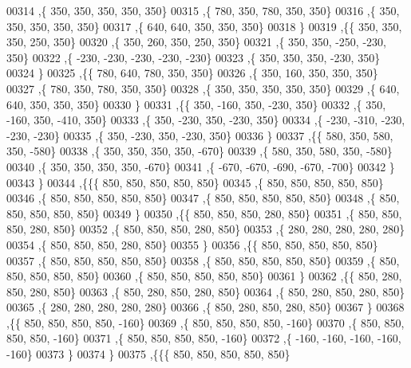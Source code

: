 \begin{DoxyCode}
00314    ,\{   350,   350,   350,   350,   350\}
00315    ,\{   780,   350,   780,   350,   350\}
00316    ,\{   350,   350,   350,   350,   350\}
00317    ,\{   640,   640,   350,   350,   350\}
00318    \}
00319   ,\{\{   350,   350,   350,   250,   350\}
00320    ,\{   350,   260,   350,   250,   350\}
00321    ,\{   350,   350,  -250,  -230,   350\}
00322    ,\{  -230,  -230,  -230,  -230,  -230\}
00323    ,\{   350,   350,   350,  -230,   350\}
00324    \}
00325   ,\{\{   780,   640,   780,   350,   350\}
00326    ,\{   350,   160,   350,   350,   350\}
00327    ,\{   780,   350,   780,   350,   350\}
00328    ,\{   350,   350,   350,   350,   350\}
00329    ,\{   640,   640,   350,   350,   350\}
00330    \}
00331   ,\{\{   350,  -160,   350,  -230,   350\}
00332    ,\{   350,  -160,   350,  -410,   350\}
00333    ,\{   350,  -230,   350,  -230,   350\}
00334    ,\{  -230,  -310,  -230,  -230,  -230\}
00335    ,\{   350,  -230,   350,  -230,   350\}
00336    \}
00337   ,\{\{   580,   350,   580,   350,  -580\}
00338    ,\{   350,   350,   350,   350,  -670\}
00339    ,\{   580,   350,   580,   350,  -580\}
00340    ,\{   350,   350,   350,   350,  -670\}
00341    ,\{  -670,  -670,  -690,  -670,  -700\}
00342    \}
00343   \}
00344  ,\{\{\{   850,   850,   850,   850,   850\}
00345    ,\{   850,   850,   850,   850,   850\}
00346    ,\{   850,   850,   850,   850,   850\}
00347    ,\{   850,   850,   850,   850,   850\}
00348    ,\{   850,   850,   850,   850,   850\}
00349    \}
00350   ,\{\{   850,   850,   850,   280,   850\}
00351    ,\{   850,   850,   850,   280,   850\}
00352    ,\{   850,   850,   850,   280,   850\}
00353    ,\{   280,   280,   280,   280,   280\}
00354    ,\{   850,   850,   850,   280,   850\}
00355    \}
00356   ,\{\{   850,   850,   850,   850,   850\}
00357    ,\{   850,   850,   850,   850,   850\}
00358    ,\{   850,   850,   850,   850,   850\}
00359    ,\{   850,   850,   850,   850,   850\}
00360    ,\{   850,   850,   850,   850,   850\}
00361    \}
00362   ,\{\{   850,   280,   850,   280,   850\}
00363    ,\{   850,   280,   850,   280,   850\}
00364    ,\{   850,   280,   850,   280,   850\}
00365    ,\{   280,   280,   280,   280,   280\}
00366    ,\{   850,   280,   850,   280,   850\}
00367    \}
00368   ,\{\{   850,   850,   850,   850,  -160\}
00369    ,\{   850,   850,   850,   850,  -160\}
00370    ,\{   850,   850,   850,   850,  -160\}
00371    ,\{   850,   850,   850,   850,  -160\}
00372    ,\{  -160,  -160,  -160,  -160,  -160\}
00373    \}
00374   \}
00375  ,\{\{\{   850,   850,   850,   850,   850\}

\end{DoxyCode}
